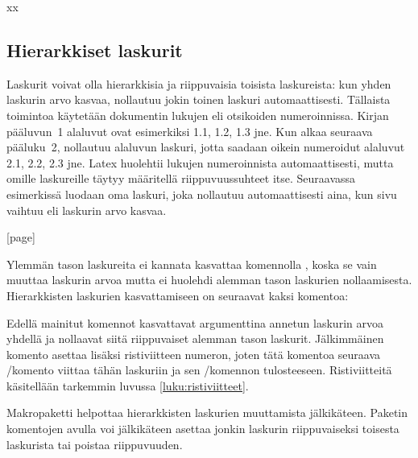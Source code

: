 \begin{tulossis}
  x\hspace{3em}x
\end{tulossis}

\subsection{Hierarkkiset laskurit}

Laskurit voivat olla hierarkkisia ja riippuvaisia toisista laskureista:
kun yhden laskurin arvo kasvaa, nollautuu jokin toinen laskuri
automaattisesti. Tällaista toimintoa käytetään dokumentin lukujen eli
otsikoiden numeroinnissa. Kirjan pääluvun~1 alaluvut ovat esimerkiksi
1.1, 1.2, 1.3 jne. Kun alkaa seuraava pääluku~2, nollautuu alaluvun
laskuri, jotta saadaan oikein numeroidut alaluvut 2.1, 2.2, 2.3 jne.
Latex huolehtii lukujen numeroinnista automaattisesti, mutta omille
laskureille täytyy määritellä riippuvuussuhteet itse. Seuraavassa
esimerkissä luodaan oma laskuri, joka nollautuu automaattisesti aina,
kun sivu vaihtuu eli laskurin  arvo kasvaa.

\begin{koodilohkosis}
  [page]
\end{koodilohkosis}

Ylemmän tason laskureita ei kannata kasvattaa komennolla , koska se vain muuttaa laskurin arvoa mutta ei
huolehdi alemman tason laskurien nollaamisesta. Hierarkkisten laskurien
kasvattamiseen on seuraavat kaksi komentoa:

\begin{koodilohkosis}
\end{koodilohkosis}

Edellä mainitut komennot kasvattavat argumenttina annetun laskurin arvoa
yhdellä ja nollaavat siitä riippuvaiset alemman tason laskurit.
Jälkimmäinen komento  asettaa lisäksi
ristiviitteen numeron, joten tätä komentoa seuraava \-/komento viittaa tähän laskuriin ja sen \-/komennon tulosteeseen. Ristiviitteitä käsitellään
tarkemmin luvussa \ref{luku:ristiviitteet}.

Makropaketti  helpottaa
hierarkkisten laskurien muuttamista jälkikäteen. Paketin komentojen
avulla voi jälkikäteen asettaa jonkin laskurin riippuvaiseksi toisesta
laskurista tai poistaa riippuvuuden.


